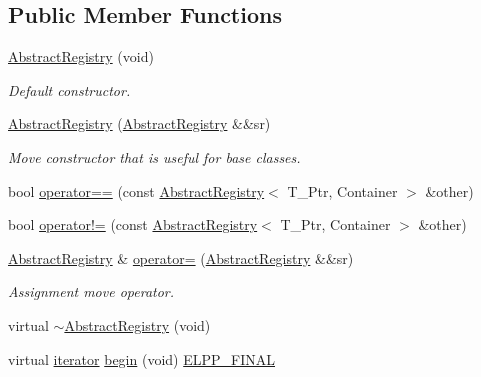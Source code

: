 \subsection*{Public Member Functions}
\begin{DoxyCompactItemize}
\item 
\hyperlink{classel_1_1base_1_1utils_1_1_abstract_registry_afe13c67ebd1ed1aa72845926894dffa2}{Abstract\+Registry} (void)
\begin{DoxyCompactList}\small\item\em Default constructor. \end{DoxyCompactList}\item 
\hyperlink{classel_1_1base_1_1utils_1_1_abstract_registry_a9f468010439d491e90419f9334afcdba}{Abstract\+Registry} (\hyperlink{classel_1_1base_1_1utils_1_1_abstract_registry}{Abstract\+Registry} \&\&sr)
\begin{DoxyCompactList}\small\item\em Move constructor that is useful for base classes. \end{DoxyCompactList}\item 
bool \hyperlink{classel_1_1base_1_1utils_1_1_abstract_registry_ac3e648dc0caa8914f8604650f00bc94b}{operator==} (const \hyperlink{classel_1_1base_1_1utils_1_1_abstract_registry}{Abstract\+Registry}$<$ T\+\_\+\+Ptr, Container $>$ \&other)
\item 
bool \hyperlink{classel_1_1base_1_1utils_1_1_abstract_registry_a35de8807521651c85acb26532a2623e1}{operator!=} (const \hyperlink{classel_1_1base_1_1utils_1_1_abstract_registry}{Abstract\+Registry}$<$ T\+\_\+\+Ptr, Container $>$ \&other)
\item 
\hyperlink{classel_1_1base_1_1utils_1_1_abstract_registry}{Abstract\+Registry} \& \hyperlink{classel_1_1base_1_1utils_1_1_abstract_registry_a5727a3cadeee6a2b10d8f46fb91956e7}{operator=} (\hyperlink{classel_1_1base_1_1utils_1_1_abstract_registry}{Abstract\+Registry} \&\&sr)
\begin{DoxyCompactList}\small\item\em Assignment move operator. \end{DoxyCompactList}\item 
virtual \hyperlink{classel_1_1base_1_1utils_1_1_abstract_registry_a6ee2c4166629bb16515cc00b738dee65}{$\sim$\+Abstract\+Registry} (void)
\item 
virtual \hyperlink{classel_1_1base_1_1utils_1_1_abstract_registry_a58d0536c748633afd3f7c237b63a9a7c}{iterator} \hyperlink{classel_1_1base_1_1utils_1_1_abstract_registry_a4ad971b1dddff996d327452d852e55b2}{begin} (void) \hyperlink{easylogging_09_09_8h_a2f812449f8d3355cf5b03ceb2ee5021b}{E\+L\+P\+P\+\_\+\+F\+I\+N\+A\+L}

\end{DoxyCompactItemize}
